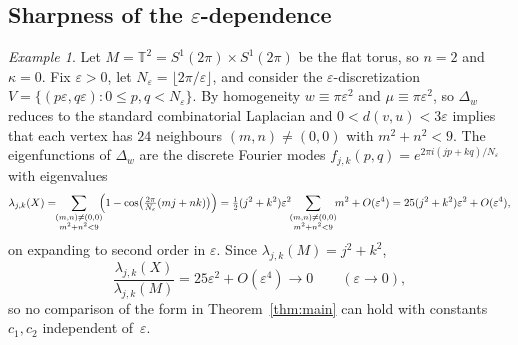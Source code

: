 \documentclass[10pt,reqno]{amsart}
\theoremstyle{remark}
\newtheorem{example}[theorem]{Example}
\begin{document}
\subsection{Sharpness of the \texorpdfstring{$\varepsilon$}{epsilon}-dependence}
\label{subsec:sharpness}

\begin{example}
\label{ex:torus}
Let $M = \mathbb{T}^2 = S^1(2\pi)\times S^1(2\pi)$ be the flat torus, so
$n=2$ and $\kappa=0$. Fix $\varepsilon>0$, let $N_\varepsilon=\lfloor 2\pi/\varepsilon\rfloor$,
and consider the $\varepsilon$-discretization $V=\{(p\varepsilon,q\varepsilon):
0\le p,q<N_\varepsilon\}$. By homogeneity $w\equiv\pi\varepsilon^2$ and
$\mu\equiv\pi\varepsilon^2$, so $\Delta_w$ reduces to the standard
combinatorial Laplacian and $0<d(v,u)<3\varepsilon$ implies that
each vertex has $24$ neighbours $(m,n)\neq(0,0)$ with $m^2+n^2<9$. The eigenfunctions of $\Delta_w$ are the discrete Fourier modes $f_{j,k}(p,q) = e^{2\pi i(jp+kq)/N_\varepsilon}$ with eigenvalues
\[
  \lambda_{j,k}(X)
  =\!\!\sum_{\substack{(m,n)\neq(0,0)\\ m^2+n^2<9}}\!\!
   \Bigl(1-\cos\bigl(\tfrac{2\pi}{N_\varepsilon}(mj+nk)\bigr)\Bigr)
  =\tfrac12(j^2+k^2)\varepsilon^2\!\!
   \sum_{\substack{(m,n)\neq(0,0)\\ m^2+n^2<9}}\!\! m^2+O(\varepsilon^4)
  =25(j^2+k^2)\varepsilon^2+O(\varepsilon^4),
\]
on expanding to second order in $\varepsilon$. Since $\lambda_{j,k}(M)=j^2+k^2$,
\[
  \frac{\lambda_{j,k}(X)}{\lambda_{j,k}(M)}
  =25\varepsilon^2+O(\varepsilon^4)\longrightarrow 0
  \qquad(\varepsilon\to0),
\]
so no comparison of the form in Theorem~\ref{thm:main} can hold with
constants $c_1,c_2$ independent of~$\varepsilon$.
\end{example}

\end{document}
